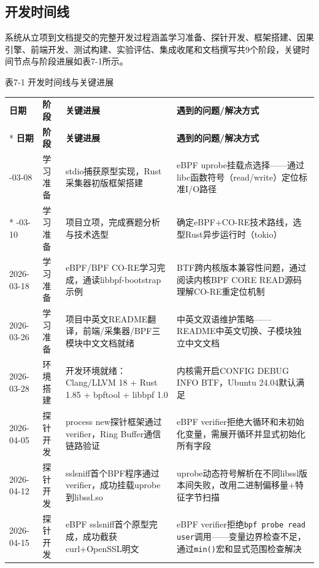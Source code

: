 \documentclass[a4paper]{ctexart}
\makeatletter
\renewcommand{\_}{%
  \ifmmode
    \nfss@text{\textunderscore}%
  \else
    \textunderscore\discretionary{}{}{}%
  \fi}
\makeatother
\begin{document}
\subsection{开发时间线}



系统从立项到文档提交的完整开发过程涵盖学习准备、探针开发、框架搭建、因果引擎、前端开发、测试构建、实验评估、集成收尾和文档撰写共9个阶段，关键时间节点与阶段进展如表7-1所示。



\medskip
{\centering\small
表7-1 开发时间线与关键进展\par
\vspace{3pt}
\setlength{\tabcolsep}{6pt}
\renewcommand{\arraystretch}{1.1}
\begin{longtable}{@{} p{4.2cm} p{1.8cm} p{5cm} p{4.2cm} @{}}
\hline
\textbf{日期} & \textbf{阶段} & \textbf{关键进展} & \textbf{遇到的问题/解决方式} \\*
\hline
\endfirsthead
\hline
\textbf{日期} & \textbf{阶段} & \textbf{关键进展} & \textbf{遇到的问题/解决方式} \\
\hline
\endhead
\hline
\endfoot
\hline
\endlastfoot
2026-03-08 & 学习准备 & stdio捕获原型实现，Rust采集器初版框架搭建 & eBPF uprobe挂载点选择——通过libc函数符号（read/write）定位标准I/O路径 \\*
\hline
2026-03-10 & 学习准备 & 项目立项，完成赛题分析与技术选型 & 确定eBPF+CO-RE技术路线，选型Rust异步运行时（tokio） \\
\hline
2026-03-18 & 学习准备 & eBPF/BPF CO-RE学习完成，通读libbpf-bootstrap示例 & BTF跨内核版本兼容性问题，通过阅读内核BPF\_CORE\_READ源码理解CO-RE重定位机制 \\
\hline
2026-03-26 & 学习准备 & 项目中英文README翻译，前端/采集器/BPF三模块中文文档就绪 & 中英文双语维护策略——README中英文切换、子模块独立中文文档 \\
\hline
2026-03-28 & 环境搭建 & 开发环境就绪：Clang/LLVM 18 + Rust 1.85 + bpftool + libbpf 1.0 & 内核需开启CONFIG\_DEBUG\_INFO\_BTF，Ubuntu 24.04默认满足 \\
\hline
2026-04-05 & 探针开发 & process\_new探针框架通过verifier，Ring Buffer通信链路验证 & eBPF verifier拒绝大循环和未初始化变量，需展开循环并显式初始化所有字段 \\
\hline
2026-04-12 & 探针开发 & sslsniff首个BPF程序通过verifier，成功挂载uprobe到libssl.so & uprobe动态符号解析在不同libssl版本间失败，改用二进制偏移量+特征字节扫描 \\
\hline
2026-04-15 & 探针开发 & eBPF sslsniff首个原型完成，成功截获curl+OpenSSL明文 & eBPF verifier拒绝\texttt{bpf\_probe\_read\_user}调用——变量边界检查不足，通过\texttt{min()}宏和显式范围检查解决 \\

\end{longtable}}
\end{document}
